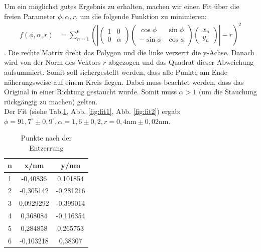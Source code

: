 Um ein möglichst gutes Ergebnis zu erhalten, machen wir einen Fit über die freien Parameter $\phi, \alpha, r$, um die folgende Funktion zu minimieren:
\begin{align*}
f(\phi,\alpha,r) &= \sum\limits_{n = 1}^6 \left(\left|
\begin{pmatrix}
1 & 0\\
0 & \alpha
\end{pmatrix}
\begin{pmatrix}
\cos{\phi} & \sin{\phi}\\
-\sin{\phi} & \cos{\phi}
\end{pmatrix}
\begin{pmatrix}
x_n\\
y_n
\end{pmatrix}
  \right| - r\right)^2
\end{align*}.
Die rechte Matrix dreht das Polygon und die linke verzerrt die y-Achse. Danach wird von der Norm des Vektors $r$ abgezogen und das Quadrat dieser Abweichung aufsummiert. Somit soll sichergestellt werden, dass alle Punkte am Ende näherungsweise auf einem Kreis liegen. Dabei muss beachtet werden, dass das Original in einer Richtung gestaucht wurde. Somit muss $\alpha > 1$ (um die Stauchung rückgängig zu machen) gelten.\\
Der Fit (siehe Tab.\ref{tab:fit}, Abb. \ref{fig:fit1}, Abb. \ref{fig:fit2}) ergab: $\phi = 91,7^\circ \pm 0,9^\circ, \alpha = 1,6 \pm 0,2, r = 0,4\si{\nano\metre} \pm 0,02\si{\nano\metre}$.\\ 

\begin{table}
\centering
\caption{Punkte nach der Entzerrung}
\begin{tabular}{ccc}
\toprule
n & x/nm & y/nm\\
\midrule
1&	-0,40836&	0,101854\\
2&	-0,305142&	-0,281216\\
3& 0,0929292&	-0,399014\\
4&	0,368084&	-0,116354\\
5&	0,284858&	0,265753\\
6&	-0,103218&	0,38307\\
\bottomrule
\end{tabular}
\label{tab:fit}
\end{table}

